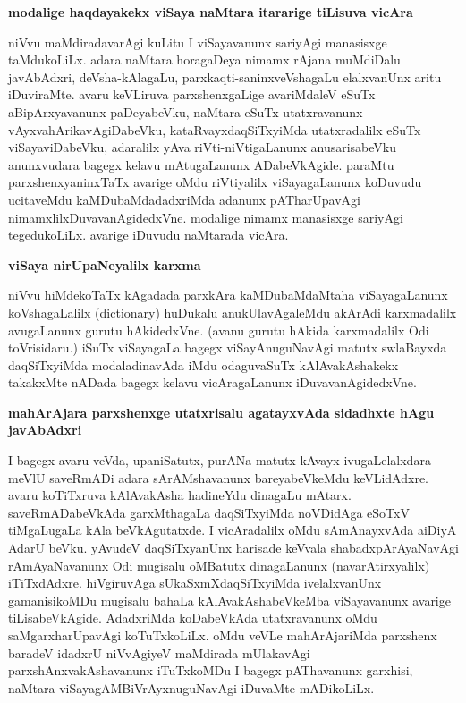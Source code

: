 {\bigskip
\noindent
{\large\bf modalige haqdayakekx viSaya naMtara itararige tiLisuva vicAra}}\label{page131}
\medskip

\noindent
niVvu maMdiradavarAgi kuLitu I viSayavanunx sariyAgi manasisxge taMdukoLiLx. adara naMtara horagaDeya nimamx rAjana muMdiDalu javAbAdxri, deVsha-kAla\-gaLu, parxkaqti-saninxveVshagaLu elalx\-vanUnx aritu iDuviraMte. avaru keVLiruva parxshenxgaLige avariMdaleV eSuTx aBipArxyavanunx paDeyabeVku, naMtara\- eSuTx utatxravanunx vAyxvahArikavAgiDabeVku, kataRvayxdaqSiTxyiMda utatxradalilx eSuTx viSaya\-viDa\-beVku, adaralilx yAva riVti-niVtigaLanunx anusarisabeVku anunxvudara bagegx kelavu mAtugaLanunx ADa\-beVkA\-gide. paraMtu parxshenxyaninxTaTx avarige oMdu riVtiyalilx viSayagaLanunx koDuvudu ucitaveMdu kaMDubaMda\-dadxriMda adanunx pATharUpavAgi nimamxlilxDuvavanAgidedxVne. modalige nimamx manasisxge sari\-yAgi tegedu\-koLiLx. avarige iDuvudu naMtarada vicAra.

{\bigskip
\noindent
{\large\bf viSaya nirUpaNeyalilx karxma}}
\medskip

\noindent
niVvu hiMdekoTaTx kAgadada parxkAra kaMDubaMdaMtaha viSayagaLanunx koVshagaLalilx ({\rm dictionary}) huDukalu anukUlavAgaleMdu akArAdi karxmadalilx avugaLanunx gurutu hAkidedxVne. (avanu gurutu hAkida karxmadalilx Odi toVrisidaru.) iSuTx viSayagaLa bagegx viSayAnuguNavAgi matutx swlaBayxda daqSiTxyiMda modaladinavAda iMdu odaguvaSuTx kAlAvakAshakekx takakxMte nADada bagegx kelavu vicAra\-gaLanunx iDuvavanAgidedxVne.

\newpage

{\bigskip
\noindent
{\large\bf mahArAjara parxshenxge utatxrisalu agatayxvAda sidadhxte hAgu javAbAdxri}}\label{page131}
\medskip

\noindent
I bagegx avaru veVda, upaniSatutx, purANa matutx kAvayx-ivugaLelalxdara meVlU saveRmADi adara sArAMshavanunx bareyabeVkeMdu keVLidAdxre. avaru koTiTxruva kAlAvakAsha hadineYdu dinagaLu mAtarx. saveRmADabeVkAda garxMthagaLa daqSiTxyiMda noVDidAga eSoTxV tiMgaLugaLa kAla beVkAgutatxde. I vicAra\-dalilx oMdu sAmAnayxvAda aiDiyA AdarU beVku. yAvudeV daqSiTxyanUnx harisade keVvala shabadxpArA\-yaNa\-vAgi rAmAyaNavanunx Odi mugisalu oMBatutx dinagaLanunx (navarAtirxyalilx) iTiTxdAdxre. hiVgiru\-vAga sUkaSxmXdaqSiTxyiMda ivelalxvanUnx gamanisikoMDu mugisalu bahaLa kAlAvakAshabeVkeMba viSaya\-vanunx avarige tiLisabeVkAgide. AdadxriMda koDabeVkAda utatxravanunx oMdu saMgarxharUpavAgi koTuTx\-koLiLx. oMdu veVLe mahArAjariMda parxshenx baradeV idadxrU niVvAgiyeV maMdirada mUlakavAgi parxshAnxva\-kAshavanunx iTuTxkoMDu I bagegx pAThavanunx garxhisi, naMtara viSayagAMBiVrAyxnuguNavAgi iDu\-vaMte mADikoLiLx.

